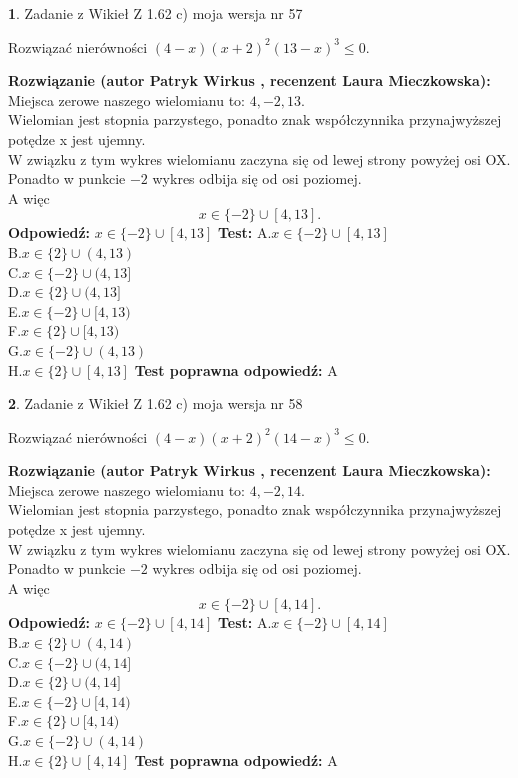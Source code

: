 \documentclass[12pt, a4paper]{article}
\theoremstyle{definition} %
\newtheorem{zad}{}
\newcommand{\zadStart}[1]{\begin{zad}#1\newline}
\newcommand{\zadStop}{\end{zad}}
\newcommand{\rozwStart}[2]{\noindent \textbf{Rozwiązanie (autor #1 , recenzent #2): }\newline}
\newcommand{\rozwStop}{\newline}
\newcommand{\odpStart}{\noindent \textbf{Odpowiedź:}\newline}
\newcommand{\odpStop}{\newline}
\newcommand{\testStart}{\noindent \textbf{Test:}\newline}
\newcommand{\testStop}{\newline}
\newcommand{\kluczStart}{\noindent \textbf{Test poprawna odpowiedź:}\newline}
\newcommand{\kluczStop}{\newline}
\begin{document}
\zadStart{Zadanie z Wikieł Z 1.62 c) moja wersja nr 57}

Rozwiązać nierówności $(4-x)(x+2)^{2}(13-x)^{3}\le0$.
\zadStop
\rozwStart{Patryk Wirkus}{Laura Mieczkowska}
Miejsca zerowe naszego wielomianu to: $4, -2, 13$.\\
Wielomian jest stopnia parzystego, ponadto znak współczynnika przy\linebreak najwyższej potędze x jest ujemny.\\ W związku z tym wykres wielomianu zaczyna się od lewej strony powyżej osi OX.\\
Ponadto w punkcie $-2$ wykres odbija się od osi poziomej.\\
A więc $$x \in \{-2\} \cup [4,13].$$
\rozwStop
\odpStart
$x \in \{-2\} \cup [4,13]$
\odpStop
\testStart
A.$x \in \{-2\} \cup [4,13]$\\
B.$x \in \{2\} \cup (4,13)$\\
C.$x \in \{-2\} \cup (4,13]$\\
D.$x \in \{2\} \cup (4,13]$\\
E.$x \in \{-2\} \cup [4,13)$\\
F.$x \in \{2\} \cup [4,13)$\\
G.$x \in \{-2\} \cup (4,13)$\\
H.$x \in \{2\} \cup [4,13]$
\testStop
\kluczStart
A
\kluczStop



\zadStart{Zadanie z Wikieł Z 1.62 c) moja wersja nr 58}

Rozwiązać nierówności $(4-x)(x+2)^{2}(14-x)^{3}\le0$.
\zadStop
\rozwStart{Patryk Wirkus}{Laura Mieczkowska}
Miejsca zerowe naszego wielomianu to: $4, -2, 14$.\\
Wielomian jest stopnia parzystego, ponadto znak współczynnika przy\linebreak najwyższej potędze x jest ujemny.\\ W związku z tym wykres wielomianu zaczyna się od lewej strony powyżej osi OX.\\
Ponadto w punkcie $-2$ wykres odbija się od osi poziomej.\\
A więc $$x \in \{-2\} \cup [4,14].$$
\rozwStop
\odpStart
$x \in \{-2\} \cup [4,14]$
\odpStop
\testStart
A.$x \in \{-2\} \cup [4,14]$\\
B.$x \in \{2\} \cup (4,14)$\\
C.$x \in \{-2\} \cup (4,14]$\\
D.$x \in \{2\} \cup (4,14]$\\
E.$x \in \{-2\} \cup [4,14)$\\
F.$x \in \{2\} \cup [4,14)$\\
G.$x \in \{-2\} \cup (4,14)$\\
H.$x \in \{2\} \cup [4,14]$
\testStop
\kluczStart
A
\kluczStop
\end{document}

